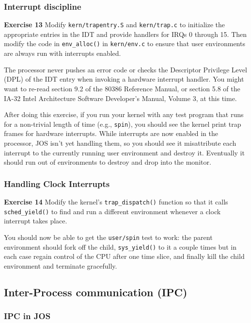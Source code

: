 \documentclass[11pt]{article}
\begin{document}
\subsubsection{Interrupt discipline}
\begin{framed}
\noindent\textbf{Exercise 13} Modify \lstinline|kern/trapentry.S| and \lstinline|kern/trap.c| to initialize the appropriate entries in the IDT and provide handlers for IRQs 0 through 15. Then modify the code in \lstinline|env_alloc()| in \lstinline|kern/env.c| to ensure that user environments are always run with interrupts enabled.

The processor never pushes an error code or checks the Descriptor Privilege Level (DPL) of the IDT entry when invoking a hardware interrupt handler. You might want to re-read section 9.2 of the 80386 Reference Manual, or section 5.8 of the IA-32 Intel Architecture Software Developer's Manual, Volume 3, at this time.

After doing this exercise, if you run your kernel with any test program that runs for a non-trivial length of time (e.g., \lstinline|spin|), you should see the kernel print trap frames for hardware interrupts. While interrupts are now enabled in the processor, JOS isn't yet handling them, so you should see it misattribute each interrupt to the currently running user environment and destroy it. Eventually it should run out of environments to destroy and drop into the monitor.
\end{framed}
\subsubsection{Handling Clock Interrupts}
\begin{framed}
\noindent\textbf{Exercise 14} Modify the kernel's \lstinline|trap_dispatch()| function so that it calls \lstinline|sched_yield()| to find and run a different environment whenever a clock interrupt takes place.

You should now be able to get the \lstinline|user/spin| test to work: the parent environment should fork off the child, \lstinline|sys_yield()| to it a couple times but in each case regain control of the CPU after one time slice, and finally kill the child environment and terminate gracefully.
\end{framed}
\subsection{Inter-Process communication (IPC)}
\subsubsection{IPC in JOS}
\end{document}
